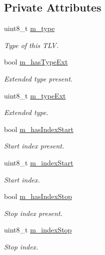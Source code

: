 \subsection*{Private Attributes}
\begin{DoxyCompactItemize}
\item 
uint8\+\_\+t \hyperlink{classns3_1_1PbbTlv_a5ce6eb47d11aa385cd606cbd90eafdec}{m\+\_\+type}
\begin{DoxyCompactList}\small\item\em Type of this T\+LV. \end{DoxyCompactList}\item 
bool \hyperlink{classns3_1_1PbbTlv_ac5013dff1df237084ca5559031418a84}{m\+\_\+has\+Type\+Ext}
\begin{DoxyCompactList}\small\item\em Extended type present. \end{DoxyCompactList}\item 
uint8\+\_\+t \hyperlink{classns3_1_1PbbTlv_abd6bb11be5d5b88924111ecaf852c2c6}{m\+\_\+type\+Ext}
\begin{DoxyCompactList}\small\item\em Extended type. \end{DoxyCompactList}\item 
bool \hyperlink{classns3_1_1PbbTlv_a65915c1a92534f30af37ca8ca3eb728f}{m\+\_\+has\+Index\+Start}
\begin{DoxyCompactList}\small\item\em Start index present. \end{DoxyCompactList}\item 
uint8\+\_\+t \hyperlink{classns3_1_1PbbTlv_a4e282e3605b8871be2c2fb7fe63cd653}{m\+\_\+index\+Start}
\begin{DoxyCompactList}\small\item\em Start index. \end{DoxyCompactList}\item 
bool \hyperlink{classns3_1_1PbbTlv_a996e0cb531098c670b1ea60cad83563b}{m\+\_\+has\+Index\+Stop}
\begin{DoxyCompactList}\small\item\em Stop index present. \end{DoxyCompactList}\item 
uint8\+\_\+t \hyperlink{classns3_1_1PbbTlv_a1891c005ff2c6c707345bf580848d9ec}{m\+\_\+index\+Stop}
\begin{DoxyCompactList}\small\item\em Stop index. \end{DoxyCompactList}\item 

\end{DoxyCompactItemize}
